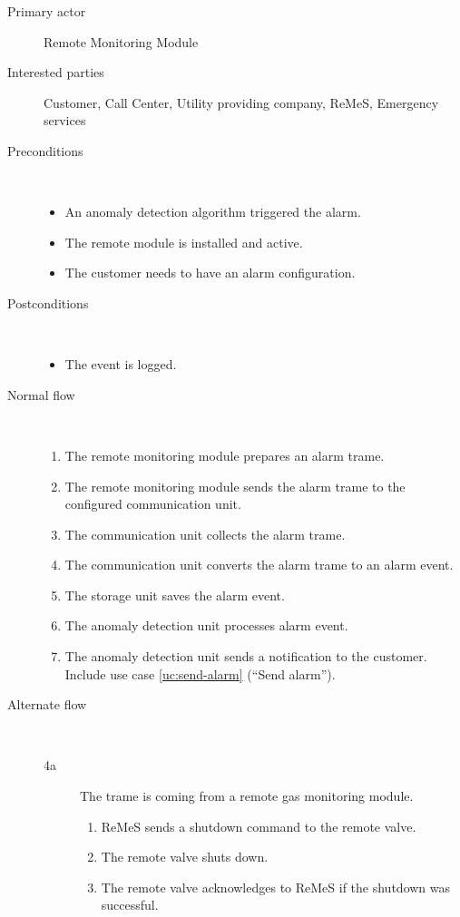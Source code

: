 \begin{description}
	\item[Primary actor] Remote Monitoring Module
	\item[Interested parties] Customer, Call Center, Utility providing company,
	ReMeS, Emergency services
	\item[Preconditions] \ 
	\begin{itemize}
	  	\item An anomaly detection algorithm triggered the alarm.
		\item The remote module is installed and active.
		\item The customer needs to have an alarm configuration.
	\end{itemize}
	\item[Postconditions] \ 
	\begin{itemize}
		\item The event is logged.
	\end{itemize}
	\item[Normal flow] \ 
	\begin{enumerate}
	  	\item The remote monitoring module prepares an alarm trame.
	  	\item The remote monitoring module sends the alarm trame to the configured
	  	communication unit. 
	  	\item The communication unit collects the alarm trame.
		\item The communication unit converts the alarm trame to an alarm event.
		\item The storage unit saves the alarm event.
	  	\item The anomaly detection unit processes alarm event.
	  	\item The anomaly detection unit sends a notification to the customer.
	  	Include use case \ref{uc:send-alarm} (``Send alarm'').
	\end{enumerate}
	\item[Alternate flow] \ 
	\begin{description}
		\item[4a] The trame is coming from a remote gas monitoring module.
			\begin{enumerate}
				\item ReMeS sends a shutdown command to the remote valve.
				\item The remote valve shuts down.
				\item The remote valve acknowledges to ReMeS if the shutdown was successful.

\end{enumerate}
\end{description}
\end{description}
